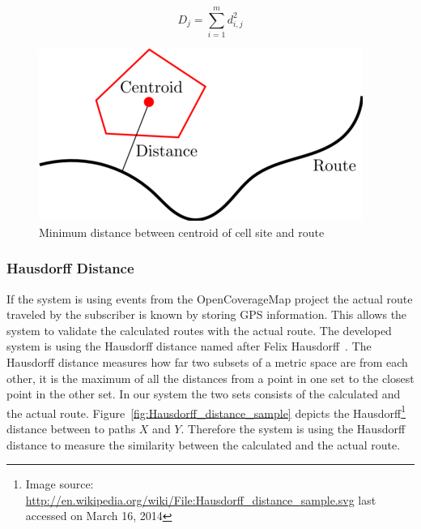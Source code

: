 \documentclass[master,english]{hgbthesis}
\begin{document}
\begin{equation}

	\label{eq:sumsquaremine}

	D_j=\sum_{i=1}^{m} d_{i,j}^{2}

\end{equation}





\begin{figure}

	\centering

	\includegraphics[width=0.7\linewidth]{./images/rms.png}

	\caption{Minimum distance between centroid of cell site and route}

	\label{fig:rms}

\end{figure}

\subsubsection{Hausdorff Distance}

If the system is using events from the OpenCoverageMap project the actual route traveled by the subscriber is known by storing GPS information. This allows the system to validate the calculated routes with the actual route. The developed system is using the Hausdorff distance named after Felix Hausdorff~\cite{Rockafellar1998}. The Hausdorff distance measures how far two subsets of a metric space are from each other, it is the maximum of all the distances from a point in one set to the closest point in the other set. In our system the two sets consists of the calculated and the actual route. Figure~\ref{fig:Hausdorff_distance_sample} depicts the Hausdorff\footnote{Image source: \url{http://en.wikipedia.org/wiki/File:Hausdorff_distance_sample.svg} last accessed on March 16, 2014 } distance between to paths $X$ and $Y$. Therefore the system is using the Hausdorff distance to measure the similarity between the calculated and the actual route.
\end{document}
